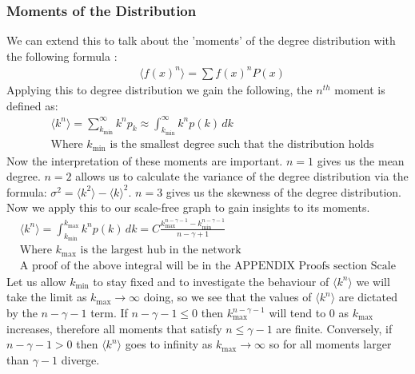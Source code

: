 \documentclass{article}
\begin{document}
            \subsubsection{Moments of the Distribution}
                We can extend this to talk about the 'moments' of the degree distribution with the following formula \parencite{papoulis2002probability}:\\
                \begin{align*}
                    &\langle f(x)^n \rangle = \sum f(x)^{n}P(x)
                \end{align*}
                Applying this to degree distribution we gain the following, the $n^{th}$ moment is defined as:\\
                \begin{align*}
                    &\langle k^n \rangle = \sum_{k_{\text{min}}}^{\infty}k^{n}p_{k} \approx \int_{k_{\text{min}}}^{\infty} k^{n}p(k)  \,dk \\
                    &\text{Where $k_{\text{min}}$ is the smallest degree such that the distribution holds}
                \end{align*}
                Now the interpretation of these moments are important. $n=1$ gives us the mean degree. $n=2$ allows us to calculate the variance of the degree distribution via the formula: $\sigma^2 = \langle k^2 \rangle - \langle k\rangle ^2$. $n=3$ gives us the skewness of the degree distribution.
                Now we apply this to our scale-free graph to gain insights to its moments.
                \begin{align*}
                    &\langle k^n \rangle = \int_{k_{\text{min}}}^{k_{\text{max}}}k^{n}p(k) \,dk = C\frac{k^{n-\gamma -1}_{\text{max}}-k^{n-\gamma -1}_{\text{min}}}{n-\gamma +1}\\
                    &\text{Where $k_{\text{max}}$ is the largest hub in the network }\\
                    &\text{A proof of the above integral will be in the APPENDIX Proofs section Scale Free number 2}
                \end{align*}
                Let us allow $k_{\text{min}}$ to stay fixed and to investigate the behaviour of $\langle k^n \rangle$ we will take the limit as $k_\text{max} \to \infty$ doing, so we see that the values of $\langle k^n \rangle$ are dictated by the $n-\gamma -1$ term. If $n-\gamma -1 \leqslant 0$ then $k^{n-\gamma -1}_{\text{max}}$ will tend to $0$ as $k_\text{max}$ increases, therefore all moments that satisfy $n\leqslant \gamma-1$ are finite. Conversely, if  $n-\gamma -1 > 0$  then $\langle k^n \rangle$ goes to infinity as $k_\text{max} \to \infty$ so for all moments larger than $\gamma-1$ diverge.\\ 
\end{document}
